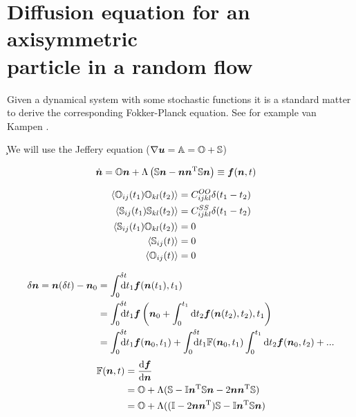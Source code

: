 \documentclass[thesis.tex]{subfiles}
\begin{document}
\chapter{Diffusion equation for an axisymmetric\\particle in a random flow}

Given a dynamical system with some stochastic functions it is a standard matter to derive the corresponding Fokker-Planck equation. See for example van Kampen \cite{kampen07}. 

̧We will use the Jeffery equation ($\nabla \mbox{\boldmath$u$} = \mathbb{A} = \mathbb{O} + \mathbb{S}$)

\begin{align*}
	\dot{\mbox{\boldmath$n$}} &= \mathbb{O} \mbox{\boldmath$n$} + \Lambda\left(\mathbb{S} \mbox{\boldmath$n$} - \mbox{\boldmath$n$} \mbox{\boldmath$n$}^{\mathrm T}\mathbb{S} \mbox{\boldmath$n$}\right)	\equiv \mbox{\boldmath$f$}(\mbox{\boldmath$n$}, t)
\end{align*}


\begin{align*}
	\left \langle \mathbb{O}_{ij}(t_1)\mathbb{O}_{kl}(t_2)\right \rangle &= C^{OO}_{ijkl}\delta(t_1-t_2) \\
	\left \langle \mathbb{S}_{ij}(t_1)\mathbb{S}_{kl}(t_2)\right \rangle &= C^{SS}_{ijkl}\delta(t_1-t_2) \\
	\left \langle \mathbb{S}_{ij}(t_1)\mathbb{O}_{kl}(t_2)\right \rangle &= 0 \\
	\left \langle \mathbb{S}_{ij}(t)\right \rangle &= 0 \\
	\left \langle \mathbb{O}_{ij}(t)\right \rangle &= 0
\end{align*}


\begin{align*}
	\delta \ve n = \ve n(\delta t) - \ve n_0 &= \int_0^{\delta t}\!\!\!\!\!\rd t_1 \ve f (\ve n(t_1 ), t_1)\\
	&= \int_0^{\delta t}\!\!\!\!\!\rd t_1 \ve f\left(\ve n_0 + \int_0^{t_1}\rd t_2 \ve f(\ve n(t_2),t_2), t_1\right)\\
	&= \int_0^{\delta t}\!\!\!\!\!\rd t_1 \ve f (\ve n_0, t_1)+\int_0^{\delta t}\!\!\!\!\!\rd t_1 \ma F (\ve n_0, t_1)\int_0^{t_1}\rd t_2 \ve f(\ve n_0, t_2) + ...
\end{align*}
\begin{align*}
	\mathbb{F}(\mbox{\boldmath$n$}, t) &= \frac{\mathrm{d} \mbox{\boldmath$f$}}{\mathrm{d} \mbox{\boldmath$n$}} \\
	&= \mathbb{O} + \Lambda(\mathbb{S} - \mathbb{I} \mbox{\boldmath$n$}^{\mathrm T} \mathbb{S} \mbox{\boldmath$n$} - 2\mbox{\boldmath$n$}\mbox{\boldmath$n$}^{\mathrm T} \mathbb{S}) \\
	& = \mathbb{O} + \Lambda( (\mathbb{I} - 2\mbox{\boldmath$n$} \mbox{\boldmath$n$}^{\mathrm T})\mathbb{S} - \mathbb{I} \mbox{\boldmath$n$}^{\mathrm T} \mathbb{S} \mbox{\boldmath$n$} )
\end{align*}
\end{document}
